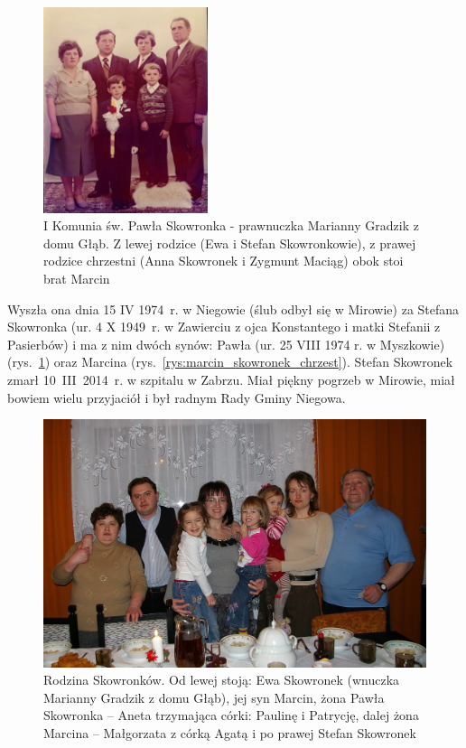\begin{figure}[!hb]
\begin{center}
\includegraphics[width=0.43\textwidth]{zdjecia/pawel_skowronek_1_komunia.jpg}
\caption[I Komunia św. Pawła Skowronka]{I Komunia św. Pawła Skowronka - prawnuczka Marianny Gradzik z domu Głąb. Z lewej rodzice (Ewa i Stefan Skowronkowie), z prawej rodzice chrzestni (Anna Skowronek i Zygmunt Maciąg) obok stoi brat Marcin}
\label{rys:pawel_skowronek_1_komunia}
\end{center}
\end{figure}

Wyszła ona dnia 15 IV 1974~r. w Niegowie (ślub odbył się w Mirowie) za Stefana Skowronka (ur. 4 X 1949~r. w Zawierciu z ojca Konstantego i matki Stefanii z Pasierbów) i ma z nim dwóch synów: Pawła (ur. 25 VIII 1974 r. w Myszkowie) (rys.~\ref{rys:pawel_skowronek_1_komunia}) oraz Marcina (rys.~\ref{rys:marcin_skowronek_chrzest}). Stefan Skowronek zmarł 10~III~2014~r. w szpitalu w Zabrzu. Miał piękny pogrzeb w Mirowie,  miał bowiem wielu przyjaciół i był radnym Rady Gminy Niegowa.

\begin{figure}[!t]
\begin{center}
\includegraphics[width=\textwidth]{zdjecia/rodzina_skowronkow_1.jpg}
\caption[Rodzina Skowronków]{Rodzina Skowronków. Od lewej stoją: Ewa Skowronek (wnuczka Marianny Gradzik z domu Głąb), jej syn Marcin, żona Pawła Skowronka -- Aneta trzymająca córki: Paulinę i Patrycję, dalej żona Marcina -- Małgorzata z córką Agatą i po prawej Stefan Skowronek}
\label{rys:rodzina_skowronkow_1}
\end{center}
\end{figure}

